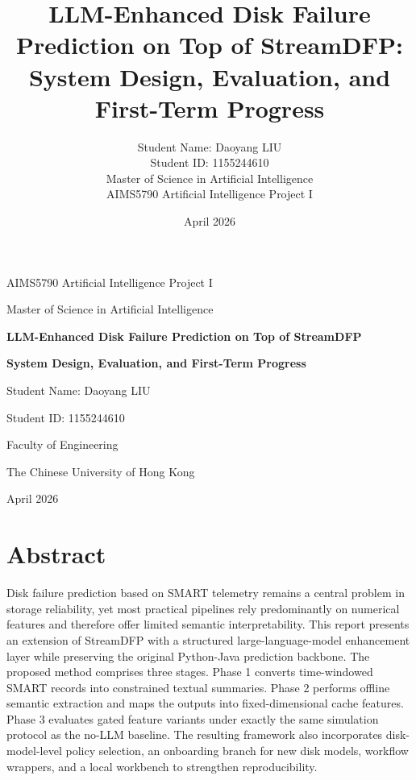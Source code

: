 \documentclass[
  11pt,
  a4paper]{article}
\title{LLM-Enhanced Disk Failure Prediction on Top of StreamDFP: System
Design, Evaluation, and First-Term Progress}
\author{Student Name: Daoyang LIU\\
Student ID: 1155244610\\
Master of Science in Artificial Intelligence\\
AIMS5790 Artificial Intelligence Project I}
\date{April 2026}
\begin{document}
\hypersetup{pageanchor=false}
\begin{titlepage}
\thispagestyle{empty}
\centering
\vspace*{1.2cm}
{\Large AIMS5790 Artificial Intelligence Project I\par}
\vspace{0.8cm}
{\large Master of Science in Artificial Intelligence\par}
\vspace{1.1cm}
{\Huge \bfseries LLM-Enhanced Disk Failure Prediction on Top of StreamDFP\par}
\vspace{0.25cm}
{\Large \bfseries System Design, Evaluation, and First-Term Progress\par}
\vfill
{\large Student Name: Daoyang LIU\par}
\vspace{0.2cm}
{\large Student ID: 1155244610\par}
\vspace{0.8cm}
{\large Faculty of Engineering\par}
{\large The Chinese University of Hong Kong\par}
\vspace{0.8cm}
{\large April 2026\par}
\end{titlepage}

\hypersetup{pageanchor=true}
{
\setcounter{tocdepth}{2}
\footnotesize
{}
\setlength{\parskip}{0pt}
\tableofcontents
}
\clearpage
{}
\hypertarget{abstract}{%
\section{Abstract}\label{abstract}}

Disk failure prediction based on SMART telemetry remains a central
problem in storage reliability, yet most practical pipelines rely
predominantly on numerical features and therefore offer limited semantic
interpretability. This report presents an extension of StreamDFP with a
structured large-language-model enhancement layer while preserving the
original Python-Java prediction backbone. The proposed method comprises
three stages. Phase 1 converts time-windowed SMART records into
constrained textual summaries. Phase 2 performs offline semantic
extraction and maps the outputs into fixed-dimensional cache features.
Phase 3 evaluates gated feature variants under exactly the same
simulation protocol as the no-LLM baseline. The resulting framework also
incorporates disk-model-level policy selection, an onboarding branch for
new disk models, workflow wrappers, and a local workbench to strengthen
reproducibility.
\end{document}
